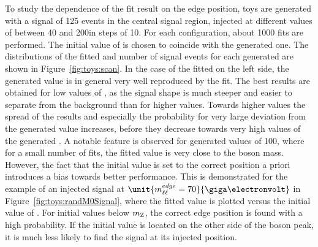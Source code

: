To study the dependence of the fit result on the edge position, toys are generated with a signal of 125 events in the central signal region, injected at different values of \mlledge between 40 and 200\GeV in steps of 10\GeV. For each configuration, about 1000 fits are performed. The initial value of \mlledge is chosen to coincide with the generated one. The distributions of the fitted \mlledge and number of signal events for each generated \mlledge are shown in Figure~\ref{fig:toys:scan}. In the case of the fitted \mlledge on the left side, the generated value is in general very well reproduced by the fit. The best results are obtained for low values of \mlledge, as the signal shape is much steeper and easier to separate from the background than for higher values. Towards higher values the spread of the results and especially the probability for very large deviation from the generated value increases, before they decrease towards very high values of the generated \mlledge. A notable feature is observed for generated values of 100\GeV, where for a small number of fits, the fitted value is very close to the \Z boson mass. However, the fact that the initial value is set to the correct position a priori introduces a bias towards better performance. This is demonstrated for the example of an injected signal at $\unit{\mlledge = 70}{\giga\electronvolt}$ in Figure~\ref{fig:toys:randM0Signal}, where the fitted value is plotted versus the initial value of \mlledge. For initial values below $m_{\mathrm{Z}}$, the correct edge position is found with a high probability. If the initial value is located on the other side of the \Z boson peak, it is much less likely to find the signal at its injected position. 

